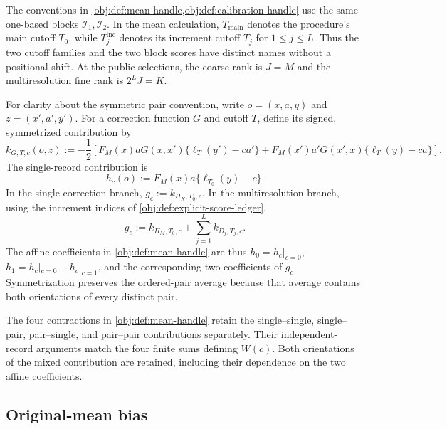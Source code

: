 \documentclass[11pt]{article}
\begin{document}
The conventions in \cref{obj:def:mean-handle,obj:def:calibration-handle} use the same one-based blocks \(\mathcal I_1,\mathcal I_2\). In the mean calculation, \(T_{\mathrm{main}}\) denotes the procedure's main cutoff \(T_0\), while \(T_j^{\mathrm{inc}}\) denotes its increment cutoff \(T_j\) for \(1\le j\le L\). Thus the two cutoff families and the two block scores have distinct names without a positional shift. At the public selections, the coarse rank is \(J=M\) and the multiresolution fine rank is \(2^LJ=K\).

For clarity about the symmetric pair convention, write \(o=(x,a,y)\) and \(z=(x',a',y')\). For a correction function \(G\) and cutoff \(T\), define its signed, symmetrized contribution by
\[
k_{G,T,c}(o,z)
:=-\frac12\left[
F_M(x)aG(x,x')\{\ell_T(y')-ca'\}
+
F_M(x')a'G(x',x)\{\ell_T(y)-ca\}
\right].
\]
The single-record contribution is
\[
h_c(o):=F_M(x)a\{\ell_{T_0}(y)-c\}.
\]
In the single-correction branch, \(g_c:=k_{\Pi_K,T_0,c}\). In the multiresolution branch, using the increment indices of \cref{obj:def:explicit-score-ledger},
\[
g_c:=k_{\Pi_M,T_0,c}
+\sum_{j=1}^{L}k_{D_j,T_j,c}.
\]
The affine coefficients in \cref{obj:def:mean-handle} are thus \(h_0=h_c|_{c=0}\), \(h_1=h_c|_{c=0}-h_c|_{c=1}\), and the corresponding two coefficients of \(g_c\). Symmetrization preserves the ordered-pair average because that average contains both orientations of every distinct pair.

The four contractions in \cref{obj:def:mean-handle} retain the single--single, single--pair, pair--single, and pair--pair contributions separately. Their independent-record arguments match the four finite sums defining \(W(c)\). Both orientations of the mixed contribution are retained, including their dependence on the two affine coefficients.

\subsection{Original-mean bias}
\end{document}

